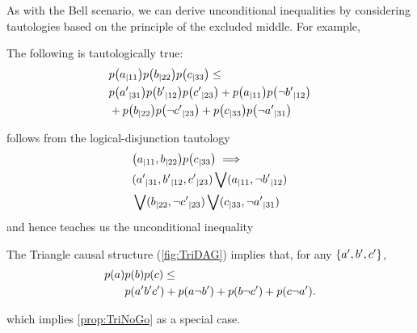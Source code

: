 \begin{EDITING...}
As with the Bell scenario, we can derive unconditional inequalities by considering tautologies based on the principle of the excluded middle. For example,
\begin{taut}\label{taut:FritzF2}The following is tautologically true:
\begin{align*}
\begin{split}
&\p{a_{|11}}\p{b_{|22}}\p{c_{|33}}\leq\\& \p{{a'}_{|31}}\p{{b'}_{|12}}\p{{c'}_{|23}} + \p{a_{|11}}\p{{\nb'}_{|12}} \\&+ \p{b_{|22}}\p{{\nc'}_{|23}} + \p{c_{|33}}\p{{\na'}_{|31}}
\end{split}
\end{align*}
\end{taut}
follows from the logical-disjunction tautology 
\begin{align}\begin{split}
&\parens*{a_{|11},b_{|22}}\p{c_{|33}}\implies\\& \parens{{a'}_{|31},{b'}_{|12},{c'}_{|23}} \bigvee \parens{a_{|11},{\nb'}_{|12}} \\&\bigvee \parens{b_{|22},{\nc'}_{|23}} \bigvee \parens{c_{|33},{\na'}_{|31}}
\end{split}\end{align}
and hence teaches us the unconditional inequality
\begin{prop} \label{prop:FritzF2}
The Triangle causal structure (\cref{fig:TriDAG}) implies that, for any $\left\lbrace a',b',c'\right\rbrace$,
\begin{align*}\begin{split}
\p{a}&\p{b}\p{c}\leq\\& \p{a'b'c'} + \p{a\nb'} + \p{b\nc'} + \p{c\na'}.
\end{split}\end{align*}
\end{prop}
which implies \cref{prop:TriNoGo} as a special case.

\end{EDITING...}
